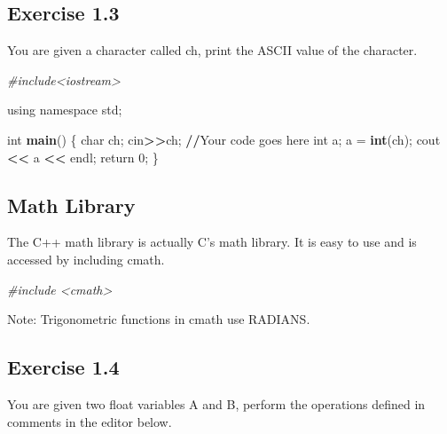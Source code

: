 \documentclass[
]{article}
\newenvironment{Shaded}{\begin{snugshade}}{\end{snugshade}}
\newcommand{\CommentTok}[1]{\textcolor[rgb]{0.56,0.35,0.01}{\textit{#1}}}
\newcommand{\DecValTok}[1]{\textcolor[rgb]{0.00,0.00,0.81}{#1}}
\newcommand{\ErrorTok}[1]{\textcolor[rgb]{0.64,0.00,0.00}{\textbf{#1}}}
\newcommand{\FunctionTok}[1]{\textcolor[rgb]{0.13,0.29,0.53}{\textbf{#1}}}
\newcommand{\NormalTok}[1]{#1}
\newcommand{\OtherTok}[1]{\textcolor[rgb]{0.56,0.35,0.01}{#1}}
\newcommand{\SpecialCharTok}[1]{\textcolor[rgb]{0.81,0.36,0.00}{\textbf{#1}}}
\begin{document}
\subsection{Exercise 1.3}\label{exercise-1.3}

You are given a character called ch, print the ASCII value of the
character.

\begin{Shaded}
\begin{Highlighting}[]
\CommentTok{\#include\textless{}iostream\textgreater{}}

\NormalTok{using namespace std;}

\NormalTok{int }\FunctionTok{main}\NormalTok{()  \{}
\NormalTok{    char ch;}
\NormalTok{    cin}\SpecialCharTok{\textgreater{}}\ErrorTok{\textgreater{}}\NormalTok{ch;}
    \SpecialCharTok{/}\ErrorTok{/}\NormalTok{Your code goes here}
\NormalTok{    int a;}
\NormalTok{    a }\OtherTok{=}  \FunctionTok{int}\NormalTok{(ch);}
\NormalTok{    cout }\SpecialCharTok{\textless{}}\ErrorTok{\textless{}}\NormalTok{ a }\SpecialCharTok{\textless{}}\ErrorTok{\textless{}}\NormalTok{ endl;}
\NormalTok{    return }\DecValTok{0}\NormalTok{;}
\NormalTok{\}}
\end{Highlighting}
\end{Shaded}

\subsection{Math Library}\label{math-library}

The C++ math library is actually C's math library. It is easy to use and
is accessed by including cmath.

\begin{Shaded}
\begin{Highlighting}[]
\CommentTok{\#include \textless{}cmath\textgreater{}}
\end{Highlighting}
\end{Shaded}

Note: Trigonometric functions in cmath use RADIANS.

\subsection{Exercise 1.4}\label{exercise-1.4}

You are given two float variables A and B, perform the operations
defined in comments in the editor below.
\end{document}
